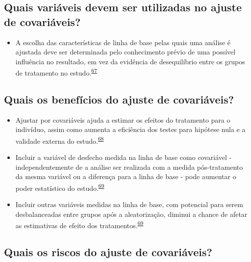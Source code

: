 \documentclass[
]{book}
\providecommand{\tightlist}{%
  \setlength{\itemsep}{0pt}\setlength{\parskip}{0pt}}
\begin{document}
\hypertarget{quais-variuxe1veis-devem-ser-utilizadas-no-ajuste-de-covariuxe1veis}{%
\subsection{Quais variáveis devem ser utilizadas no ajuste de covariáveis?}\label{quais-variuxe1veis-devem-ser-utilizadas-no-ajuste-de-covariuxe1veis}}

\begin{itemize}
\tightlist
\item
  A escolha das características de linha de base pelas quais uma análise é ajustada deve ser determinada pelo conhecimento prévio de uma possível influência no resultado, em vez da evidência de desequilíbrio entre os grupos de tratamento no estudo.\textsuperscript{\protect\hyperlink{ref-roberts1999}{67}}
\end{itemize}

\hypertarget{quais-os-benefuxedcios-do-ajuste-de-covariuxe1veis}{%
\subsection{Quais os benefícios do ajuste de covariáveis?}\label{quais-os-benefuxedcios-do-ajuste-de-covariuxe1veis}}

\begin{itemize}
\item
  Ajustar por covariáveis ajuda a estimar os efeitos do tratamento para o indivíduo, assim como aumenta a eficiência dos testes para hipótese nula e a validade externa do estudo.\textsuperscript{\protect\hyperlink{ref-Hauck1998}{68}}
\item
  Incluir a variável de desfecho medida na linha de base como covariável - independentemente de a análise ser realizada com a medida pós-tratamento da mesma variável ou a diferença para a linha de base - pode aumentar o poder estatístico do estudo.\textsuperscript{\protect\hyperlink{ref-Kahan2014}{69}}
\item
  Incluir outras variáveis medidas na linha de base, com potencial para serem desbalanceadas entre grupos após a aleatorização, diminui a chance de afetar as estimativas de efeito dos tratamentos.\textsuperscript{\protect\hyperlink{ref-Kahan2014}{69}}
\end{itemize}

\hypertarget{quais-os-riscos-do-ajuste-de-covariuxe1veis}{%
\subsection{Quais os riscos do ajuste de covariáveis?}\label{quais-os-riscos-do-ajuste-de-covariuxe1veis}}
\end{document}
